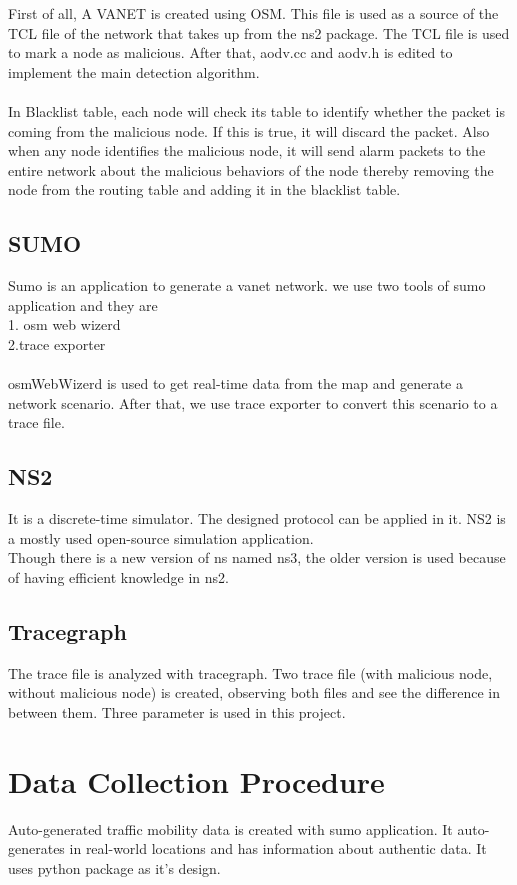 First of all, A VANET is created using OSM. This file is used as a source of the TCL file of the network that takes up from the ns2 package. The TCL file is used to mark a node as malicious. After that, aodv.cc and aodv.h is edited to implement the main detection algorithm. \\\\
In Blacklist table, each node will check its table to identify
whether the packet is coming from the malicious node. If this is
true, it will discard the packet. Also when any node identifies
the malicious node, it will send alarm packets to the entire
network about the malicious behaviors of the node thereby
removing the node from the routing table and adding it in the
blacklist table.

\subsection{SUMO}
Sumo is an application to generate a vanet network. we use two tools of sumo application and they are \\
1. osm web wizerd\\
2.trace exporter\\\\
osmWebWizerd is used to get real-time data from the map and generate a network scenario. After that, we use trace exporter to convert this scenario to a trace file.


\subsection{NS2}
It is a discrete-time simulator. The designed protocol can be applied in it. NS2 is a mostly used open-source simulation application. \\
Though there is a new version of ns named ns3, the older version is used because of having efficient knowledge in ns2.
\subsection{Tracegraph}
The trace file is analyzed with tracegraph. Two trace file (with malicious node, without malicious node) is created, observing both files and see the difference in between them. Three parameter is used in this project.

\section{Data Collection Procedure}
Auto-generated traffic mobility data is created with sumo application.
It auto-generates in real-world locations and has information about authentic data. It uses python package as it's design.

